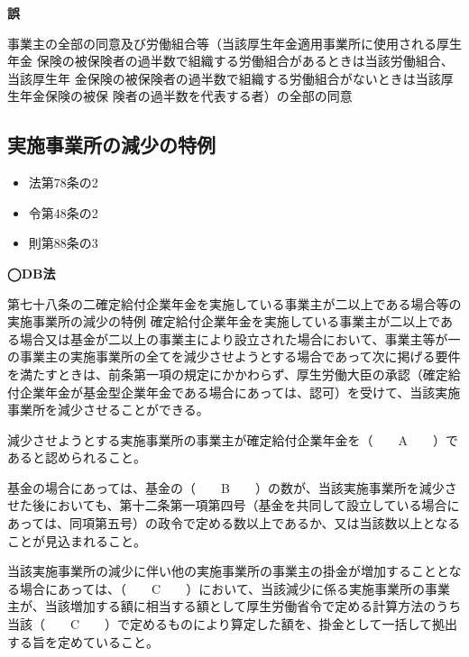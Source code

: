 \begin{answerbox}
  \textbf{誤}

  事業主の全部の同意及び労働組合等（当該厚生年金適用事業所に使用される厚生年金
保険の被保険者の過半数で組織する労働組合があるときは当該労働組合、当該厚生年
金保険の被保険者の過半数で組織する労働組合がないときは当該厚生年金保険の被保
険者の過半数を代表する者）の全部の同意
\end{answerbox}

\newpage

\subsection{実施事業所の減少の特例}


\begin{InyouJobunbox}
  \begin{itemize}
    \item 法第78条の2
    \item 令第48条の2
    \item 則第88条の3
  \end{itemize}
\end{InyouJobunbox}

\begin{fillblank}[年金1 2021 問題1(1)C　\&　年金2 H28 問題1(3)A〜C]
  \noindent \textbf{◯DB法}
  \begin{lawstructure}
    \begin{lawarticle}{第七十八条の二}{確定給付企業年金を実施している事業主が二以上である場合等の実施事業所の減少の特例}
      確定給付企業年金を実施している事業主が二以上である場合又は基金が二以上の事業主により設立された場合において、事業主等が一の事業主の実施事業所の全てを減少させようとする場合であって次に掲げる要件を満たすときは、前条第一項の規定にかかわらず、厚生労働大臣の承認（確定給付企業年金が基金型企業年金である場合にあっては、認可）を受けて、当該実施事業所を減少させることができる。

      減少させようとする実施事業所の事業主が確定給付企業年金を（　　A　　）であると認められること。

      基金の場合にあっては、基金の（　　B　　）の数が、当該実施事業所を減少させた後においても、第十二条第一項第四号（基金を共同して設立している場合にあっては、同項第五号）の政令で定める数以上であるか、又は当該数以上となることが見込まれること。

      当該実施事業所の減少に伴い他の実施事業所の事業主の掛金が増加することとなる場合にあっては、（　　C　　）において、当該減少に係る実施事業所の事業主が、当該増加する額に相当する額として厚生労働省令で定める計算方法のうち当該（　　C　　）で定めるものにより算定した額を、掛金として一括して拠出する旨を定めていること。
    \end{lawarticle}
  \end{lawstructure}
\end{fillblank}


